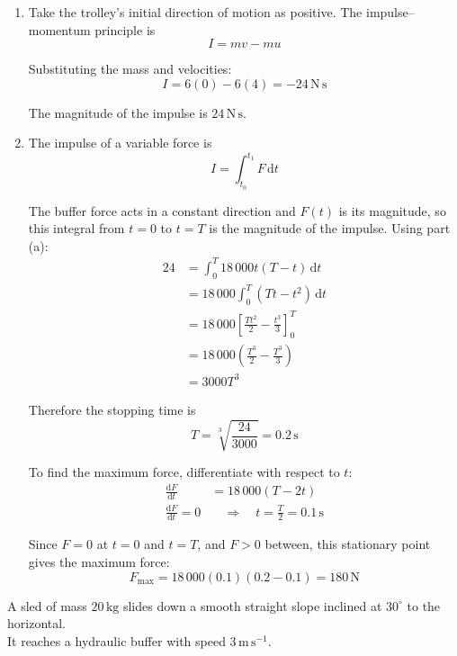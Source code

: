 \documentclass[leqno]{article}
\begin{document}
\begin{enumerate}[
  label=\textbf{\arabic*.},
  leftmargin=*,
  topsep=0pt,
  partopsep=0pt,
  parsep=0pt
]
\vspace*{10pt}

\begin{djsSolution}
\begin{enumerate}[label=\textbf{(\alph*)}, start=1]
\item Take the trolley's initial direction of motion as positive. The impulse--momentum principle is
\[
I=mv-mu
\]

Substituting the mass and velocities:
\[
I=6(0)-6(4)=-24\,\mathrm{N\,s}
\]

The magnitude of the impulse is \(24\,\mathrm{N\,s}\).

\item The impulse of a variable force is
\[
I=\int_{t_0}^{t_1}F\,\mathrm{d}t
\]

The buffer force acts in a constant direction and \(F(t)\) is its magnitude, so this integral from \(t=0\) to \(t=T\) is the magnitude of the impulse. Using part (a):
\begin{align*}
24&=\int_0^T 18\,000t(T-t)\,\mathrm{d}t\\
&=18\,000\int_0^T (Tt-t^2)\,\mathrm{d}t\\
&=18\,000\left[\frac{Tt^2}{2}-\frac{t^3}{3}\right]_0^T\\
&=18\,000\left(\frac{T^3}{2}-\frac{T^3}{3}\right)\\
&=3000T^3
\end{align*}

Therefore the stopping time is
\[
T=\sqrt[3]{\frac{24}{3000}}=0.2\,\mathrm{s}
\]

To find the maximum force, differentiate with respect to \(t\):
\begin{align*}
\frac{\mathrm{d}F}{\mathrm{d}t}&=18\,000(T-2t)\\
\frac{\mathrm{d}F}{\mathrm{d}t}=0&\quad\Longrightarrow\quad t=\frac{T}{2}=0.1\,\mathrm{s}
\end{align*}

Since \(F=0\) at \(t=0\) and \(t=T\), and \(F>0\) between, this stationary point gives the maximum force:
\[
F_{\max}=18\,000(0.1)(0.2-0.1)=180\,\mathrm{N}
\]

\end{enumerate}
\end{djsSolution}

\newpage

\questionitem

A sled of mass $20\,\mathrm{kg}$ slides down a smooth straight slope inclined at $30^\circ$ to the horizontal. \\
It reaches a hydraulic buffer with speed $3\,\mathrm{m\,s^{-1}}$. \\


\end{enumerate}
\end{document}
